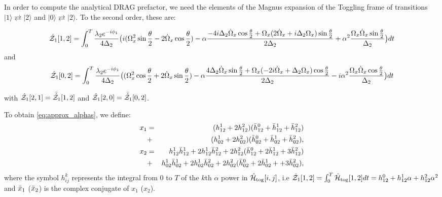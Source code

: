 \documentclass[superscriptaddress,amsmath,amssymb,aps,twocolumn,praplied,notitlepage]{revtex4-2}
\newcommand{\ket}[1]{\vert #1 \rangle}
\begin{document}
 In order to compute the analytical DRAG prefactor, we need the elements of the Magnus expansion of the Toggling frame of transitions $\ket{1}\rightleftarrows\ket{2}$ and $\ket{0}\rightleftarrows\ket{2}$. To the second order, these are:


\begin{widetext}

\begin{equation}
    \hat{\mathcal{Z}}_{1}[1,2]= \int^{T}_{0}\frac{\lambda_2 e^{-i\phi_1}}{4\Delta_2}\big{(}i( \Omega_x^2\sin{\frac{\theta}{2}-2\dot{\Omega}_x}\cos{\frac{\theta}{2}})-\alpha \frac{-4i\Delta_2\dot{\Omega}_x\cos{\frac{\theta}{2}}+\Omega_x(2\dot{\Omega}_x+i\Delta_2\Omega_x)\sin{\frac{\theta}{2}}}{2\Delta_2}+\alpha^2\frac{\Omega_x\dot{\Omega}_x\sin{\frac{\theta}{2}}}{\Delta_2}\big{)}dt
    \label{eq:Z12}
\end{equation}
and
\begin{equation}
    \hat{\mathcal{Z}}_{1}[0,2] =\int^{T}_{0} \frac{\lambda_2 e^{-i\phi_1}}{4\Delta_2}\big{(}( \Omega_x^2\cos{\frac{\theta}{2}+2\dot{\Omega}_x}\sin{\frac{\theta}{2}})-\alpha \frac{4\Delta_2\dot{\Omega}_x\sin{\frac{\theta}{2}}+\Omega_x(-2i\dot{\Omega}_x+\Delta_2\Omega_x)\cos{\frac{\theta}{2}}}{2\Delta_2}-i\alpha^2\frac{\Omega_x\dot{\Omega}_x\cos{\frac{\theta}{2}}}{\Delta_2}\big{)}dt
    \label{eq:Z02}
\end{equation}
    
\end{widetext}
with $\hat{\mathcal{Z}}_{1}[2,1] =\Bar{\hat{\mathcal{Z}}}_{1}[1,2] $ and $\hat{\mathcal{Z}}_{1}[2,0] =\Bar{\hat{\mathcal{Z}}}_{1}[0,2] $.

To obtain \ref{eq:approx_alphas}, we define:
\begin{eqnarray}\nonumber
    x_1&=&(h_{12}^{1}+2h_{12}^{2})(\Bar{h}_{12}^{0}+\Bar{h}_{12}^{1}+\Bar{h}_{12}^{2})\\\nonumber
    &+&(h_{02}^{1}+2h_{02}^{2})(\Bar{h}_{02}^{0}+\Bar{h}_{02}^{1}+\Bar{h}_{02}^{2}),\\\nonumber
        x_2&=&h_{12}^{1}\Bar{h}_{12}^1+2h_{12}^{1}\Bar{h}_{12}^2+2h_{12}^{2}(\Bar{h}_{12}^{0}+2\Bar{h}_{12}^{1}    +3\Bar{h}_{12}^{2})\nonumber\\
        &+&h_{02}^{1}\Bar{h}_{02}^1+2h_{02}^{1}\Bar{h}_{02}^2+2h_{02}^{2}(\Bar{h}_{02}^{0}+2\Bar{h}_{02}^{1}++3\Bar{h}_{02}^{2}),\nonumber
\end{eqnarray}
where the symbol $h_{ij}^{k}$ represents the integral from 0 to $T$ of the $k$th $\alpha$ power in $\hat{\mathcal{H}}_{{\rm{tog}}}[i,j]$, i.e $\hat{\mathcal{Z}}_{1}[1,2]= \int_0^T \hat{\mathcal{H}}_{{\rm{tog}}}[1,2]dt = h_{12}^{0}+h_{12}^{1}\alpha+h_{12}^2\alpha^2$ and $\Bar{x}_1$ ($\Bar{x}_2$) is the complex conjugate of $x_1$ ($x_2$).
\end{document}
